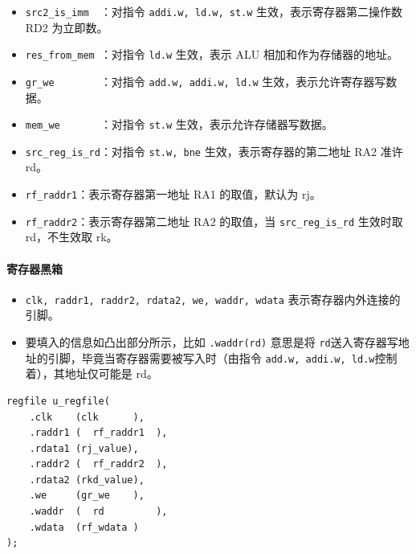 \documentclass[UTF8]{ctexart}
\begin{document}
\begin{itemize}
  \item \verb!src2_is_imm  !：对指令 \verb!addi.w, ld.w, st.w! 生效，表示寄存器第二操作数 RD2 为立即数。
  \item \verb!res_from_mem !：对指令 \verb!ld.w! 生效，表示 ALU 相加和作为存储器的地址。
  \item \verb!gr_we        !：对指令 \verb!add.w, addi.w, ld.w! 生效，表示允许寄存器写数据。
  \item \verb!mem_we       !：对指令 \verb!st.w! 生效，表示允许存储器写数据。
  \item \verb!src_reg_is_rd!：对指令 \verb!st.w, bne! 生效，表示寄存器的第二地址 RA2 准许 rd。
  \item \verb!rf_raddr1!：表示寄存器第一地址 RA1 的取值，默认为 rj。
  \item \verb!rf_raddr2!：表示寄存器第二地址 RA2 的取值，当 \verb!src_reg_is_rd! 生效时取 rd，不生效取 rk。
\end{itemize}

\paragraph{寄存器黑箱}
\begin{itemize}
    \item \verb!clk, raddr1, raddr2, rdata2, we, waddr, wdata! 表示寄存器内外连接的引脚。
    \item 要填入的信息如凸出部分所示，比如 \verb!.waddr(rd)! 意思是将 \verb!rd!送入寄存器写地址的引脚，毕竟当寄存器需要被写入时（由指令 \verb!add.w, addi.w, ld.w!控制着），其地址仅可能是 rd。
\end{itemize}

\begin{lstlisting}
regfile u_regfile(
    .clk    (clk      ),
    .raddr1 (  rf_raddr1  ),
    .rdata1 (rj_value),
    .raddr2 (  rf_raddr2  ),
    .rdata2 (rkd_value),
    .we     (gr_we    ),
    .waddr  (  rd   	  ),
    .wdata  (rf_wdata )
);
\end{lstlisting}
\end{document}
